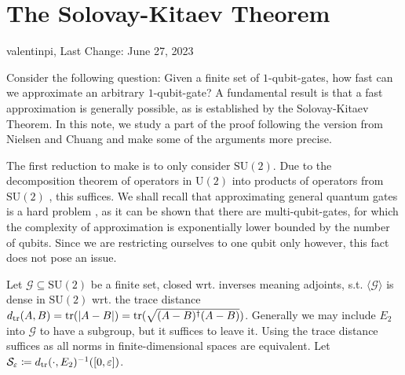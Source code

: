 \documentclass[10pt]{amsart}
\theoremstyle{definition}
\theoremstyle{remark}
\begin{document}
    \section*{The Solovay-Kitaev Theorem} \hfill \hfill valentinpi, Last Change: June 27, 2023

    \phantom{}

    Consider the following question: Given a finite set of \(1\)-qubit-gates, how fast can we approximate an arbitrary \(1\)-qubit-gate? A fundamental result is that a fast approximation is generally possible, as is established by the Solovay-Kitaev Theorem. In this note, we study a part of the proof following the version from Nielsen and Chuang and make some of the arguments more precise.

    \phantom{}

    The first reduction to make is to only consider \(\text{SU}(2)\). Due to the decomposition theorem of operators in \(\text{U}(2)\) into products of operators from \(\text{SU}(2)\) \cite[p. 176]{Nielsen}, this suffices. We shall recall that approximating general quantum gates is a hard problem \cite[pp. 198-200]{Nielsen}, as it can be shown that there are multi-qubit-gates, for which the complexity of approximation is exponentially lower bounded by the number of qubits. Since we are restricting ourselves to one qubit only however, this fact does not pose an issue.

    \phantom{}

    Let \(\mathcal{G} \subseteq \text{SU}(2)\) be a finite set, closed wrt. inverses meaning adjoints, s.t. \(\langle \mathcal{G} \rangle\) is dense in \(\text{SU}(2)\)  wrt. the trace distance \(d_{\tr}(A, B) = \trace(|A-B|) = \trace(\sqrt{(A-B)^\dagger(A-B)})\). Generally we may include \(E_2\) into \(\mathcal{G}\) to have a subgroup, but it suffices to leave it. Using the trace distance suffices as all norms in finite-dimensional spaces are equivalent. Let \(\mathcal{S}_{\varepsilon} \coloneqq d_{\tr}(\cdot, E_2)^{-1}([0, \varepsilon])\).

    \begin{figure}[!hbtp]
    \end{figure}
\end{document}

